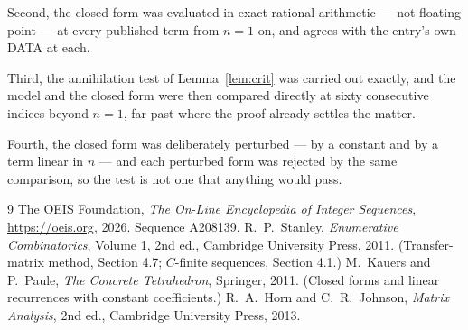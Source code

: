 \documentclass[11pt,a4paper]{article}
\theoremstyle{plain}
\theoremstyle{definition}
\begin{document}
Second, the closed form was evaluated in exact rational arithmetic --- not floating point ---
at every published term from $n=1$ on, and agrees with the entry's own DATA at each.

Third, the annihilation test of Lemma~\ref{lem:crit} was carried out exactly, and the model
and the closed form were then compared directly at sixty consecutive indices beyond
$n=1$, far past where the proof already settles the matter.

Fourth, the closed form was deliberately perturbed --- by a constant and by a term linear in
$n$ --- and each perturbed form was rejected by the same comparison, so the test is not one
that anything would pass.

\begin{thebibliography}{9}
 The OEIS Foundation, \emph{The On-Line Encyclopedia of Integer
Sequences}, \url{https://oeis.org}, 2026. Sequence A208139.
 R.~P.~Stanley, \emph{Enumerative Combinatorics}, Volume 1, 2nd ed.,
Cambridge University Press, 2011. (Transfer-matrix method, Section 4.7; $C$-finite sequences,
Section 4.1.)
 M.~Kauers and P.~Paule, \emph{The Concrete Tetrahedron}, Springer, 2011.
(Closed forms and linear recurrences with constant coefficients.)
 R.~A.~Horn and C.~R.~Johnson, \emph{Matrix Analysis}, 2nd ed., Cambridge
University Press, 2013.
\end{thebibliography}
\end{document}
